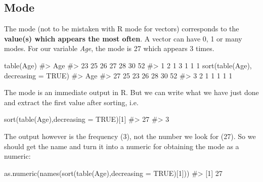 \documentclass[
  letterpaper,
  DIV=11,
  numbers=noendperiod]{scrreprt}
\newenvironment{Shaded}{\begin{snugshade}}{\end{snugshade}}
\newcommand{\AttributeTok}[1]{\textcolor[rgb]{0.40,0.45,0.13}{#1}}
\newcommand{\CommentTok}[1]{\textcolor[rgb]{0.37,0.37,0.37}{#1}}
\newcommand{\ConstantTok}[1]{\textcolor[rgb]{0.56,0.35,0.01}{#1}}
\newcommand{\DecValTok}[1]{\textcolor[rgb]{0.68,0.00,0.00}{#1}}
\newcommand{\FunctionTok}[1]{\textcolor[rgb]{0.28,0.35,0.67}{#1}}
\newcommand{\NormalTok}[1]{\textcolor[rgb]{0.00,0.23,0.31}{#1}}
\begin{document}
\subsection{Mode}\label{mode}

The mode (not to be mistaken with R mode for vectors) corresponds to the
\textbf{value(s) which appears the most often}. A vector can have 0, 1
or many modes. For our variable \emph{Age}, the mode is 27 which appears
3 times.

\begin{Shaded}
\begin{Highlighting}[]
\FunctionTok{table}\NormalTok{(Age)}
\CommentTok{\#\textgreater{} Age}
\CommentTok{\#\textgreater{} 23 25 26 27 28 30 52 }
\CommentTok{\#\textgreater{}  1  2  1  3  1  1  1}
\FunctionTok{sort}\NormalTok{(}\FunctionTok{table}\NormalTok{(Age), }\AttributeTok{decreasing =} \ConstantTok{TRUE}\NormalTok{)}
\CommentTok{\#\textgreater{} Age}
\CommentTok{\#\textgreater{} 27 25 23 26 28 30 52 }
\CommentTok{\#\textgreater{}  3  2  1  1  1  1  1}
\end{Highlighting}
\end{Shaded}

The mode is an immediate output in R. But we can write what we have just
done and extract the first value after sorting, i.e.

\begin{Shaded}
\begin{Highlighting}[]
\FunctionTok{sort}\NormalTok{(}\FunctionTok{table}\NormalTok{(Age),}\AttributeTok{decreasing =} \ConstantTok{TRUE}\NormalTok{)[}\DecValTok{1}\NormalTok{]}
\CommentTok{\#\textgreater{} 27 }
\CommentTok{\#\textgreater{}  3}
\end{Highlighting}
\end{Shaded}

The output however is the frequency (3), not the number we look for
(27). So we should get the name and turn it into a numeric for obtaining
the mode as a numeric:

\begin{Shaded}
\begin{Highlighting}[]
\FunctionTok{as.numeric}\NormalTok{(}\FunctionTok{names}\NormalTok{(}\FunctionTok{sort}\NormalTok{(}\FunctionTok{table}\NormalTok{(Age),}\AttributeTok{decreasing =} \ConstantTok{TRUE}\NormalTok{)[}\DecValTok{1}\NormalTok{]))}
\CommentTok{\#\textgreater{} [1] 27}
\end{Highlighting}
\end{Shaded}
\end{document}
